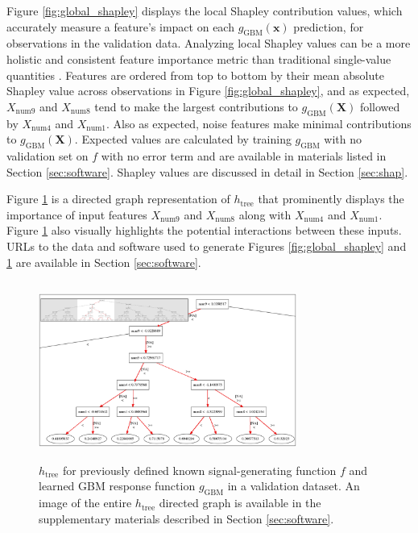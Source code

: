 \documentclass[sigconf, review]{acmart}
\begin{document}
Figure \ref{fig:global_shapley} displays the local Shapley contribution values, which accurately measure a feature's impact on each $g_{\text{GBM}}(\mathbf{x})$ prediction, for observations in the validation data. Analyzing local Shapley values can be a more holistic and consistent feature importance metric than traditional single-value quantities \cite{shapley}. Features are ordered from top to bottom by their mean absolute Shapley value across observations in Figure \ref{fig:global_shapley}, and as expected, $X_{\text{num}9}$ and $X_{\text{num}8}$ tend to make the largest contributions to $g_{\text{GBM}}(\mathbf{X})$ followed by $X_{\text{num}4}$ and $X_{\text{num}1}$. Also as expected, noise features make minimal contributions to $g_{\text{GBM}}(\mathbf{X})$. Expected values are calculated by training $g_{\text{GBM}}$ with no validation set on $f$ with no error term and are available in materials listed in Section \ref{sec:software}. Shapley values are discussed in detail in Section \ref{sec:shap}. 

Figure \ref{fig:dt_surrogate} is a directed graph representation of $h_{\text{tree}}$ that prominently displays the importance of input features $X_{\text{num}9}$ and $X_{\text{num}8}$ along with $X_{\text{num}4}$ and $X_{\text{num}1}$. Figure \ref{fig:dt_surrogate} also visually highlights the potential interactions between these inputs. URLs to the data and software used to generate Figures \ref{fig:global_shapley} and \ref{fig:dt_surrogate} are available in Section \ref{sec:software}.

\begin{figure}[htb]
	\begin{center}
		\includegraphics[height=165pt, width=240pt]{img/figure_3.eps}
		\caption{$h_{\text{tree}}$ for previously defined known signal-generating function $f$ and learned GBM response function $g_{\text{GBM}}$ in a validation dataset. An image of the entire $h_{\text{tree}}$ directed graph is available in the supplementary materials described in Section \ref{sec:software}.}
		\label{fig:dt_surrogate}
	\end{center}
\end{figure}
\end{document}
